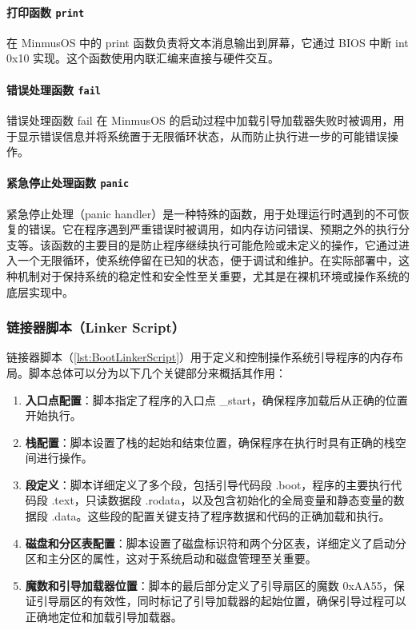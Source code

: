 \paragraph{打印函数 \texttt{print}}

在 MinmusOS 中的 print 函数负责将文本消息输出到屏幕，它通过 BIOS 中断 int 0x10 实现。这个函数使用内联汇编来直接与硬件交互。

\paragraph{错误处理函数 \texttt{fail}}

错误处理函数 fail 在 MinmusOS 的启动过程中加载引导加载器失败时被调用，用于显示错误信息并将系统置于无限循环状态，从而防止执行进一步的可能错误操作。

\paragraph{紧急停止处理函数 \texttt{panic}}

紧急停止处理（panic handler）是一种特殊的函数，用于处理运行时遇到的不可恢复的错误。它在程序遇到严重错误时被调用，如内存访问错误、预期之外的执行分支等。该函数的主要目的是防止程序继续执行可能危险或未定义的操作，它通过进入一个无限循环，使系统停留在已知的状态，便于调试和维护。在实际部署中，这种机制对于保持系统的稳定性和安全性至关重要，尤其是在裸机环境或操作系统的底层实现中。

\subsubsection{链接器脚本（Linker Script）}

链接器脚本（\cref{lst:BootLinkerScript}）用于定义和控制操作系统引导程序的内存布局。脚本总体可以分为以下几个关键部分来概括其作用：

\begin{enumerate}
    \item \textbf{入口点配置}：脚本指定了程序的入口点 \_start，确保程序加载后从正确的位置开始执行。
    \item \textbf{栈配置}：脚本设置了栈的起始和结束位置，确保程序在执行时具有正确的栈空间进行操作。
    \item \textbf{段定义}：脚本详细定义了多个段，包括引导代码段 .boot，程序的主要执行代码段 .text，只读数据段 .rodata，以及包含初始化的全局变量和静态变量的数据段 .data。这些段的配置关键支持了程序数据和代码的正确加载和执行。
    \item \textbf{磁盘和分区表配置}：脚本设置了磁盘标识符和两个分区表，详细定义了启动分区和主分区的属性，这对于系统启动和磁盘管理至关重要。
    \item \textbf{魔数和引导加载器位置}：脚本的最后部分定义了引导扇区的魔数 0xAA55，保证引导扇区的有效性，同时标记了引导加载器的起始位置，确保引导过程可以正确地定位和加载引导加载器。
\end{enumerate}

